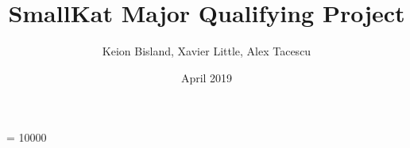 \usepackage[utf8]{inputenc}

\usepackage{bookmark}     %

\usepackage{biblatex}     %

\usepackage{enumitem}     %
\usepackage{amssymb}      %
\usepackage{pdfpages}

\usepackage{amsmath}
\usepackage{geometry}
\usepackage{graphicx}
\usepackage{multirow}
\usepackage[pagestyles]{titlesec}
\usepackage{titling}
\usepackage{sectsty}
\usepackage{caption}
\usepackage{tocstyle}
\usepackage{booktabs}%
\usepackage{float}
\usepackage{longtable}

\makeatletter
\renewcommand\paragraph{\@startsection{paragraph}{4}{\z@}%
            {-2.5ex\@plus -1ex \@minus -.25ex}%
            {1.25ex \@plus .25ex}%
            {\normalfont\normalsize\bfseries}}
\makeatother
\setcounter{secnumdepth}{4} %
\setcounter{tocdepth}{4}    %


\newcommand\scalemath[2]{\scalebox{#1}{\mbox{\ensuremath{\displaystyle #2}}}}
\usepackage[]{algorithm2e}
\pdfpagewidth 8.5in
\pdfpageheight 11in

\title{SmallKat Major Qualifying Project}
\author{Keion Bisland, Xavier Little, Alex Tacescu}
\date{April 2019}



\newcommand{\linespacing}{1.5}

\interfootnotelinepenalty = 10000 %

